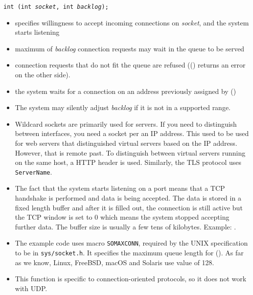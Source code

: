 

\begin{slide}
\texttt{int (int \emph{socket}, int \emph{backlog});}
\begin{itemize}
\item specifies willingness to accept incoming connections on \emph{socket}, and
the system starts listening
\item maximum of \emph{backlog} connection requests may wait in the queue to
be served
\item connection requests that do not fit the queue are refused
(() returns an error on the other side). 
\item the system waits for a connection on an address previously assigned by
()
\end{itemize}
\end{slide}

\begin{itemize}
\item The system may silently adjust \emph{backlog} if it is not in a supported
range.
\item Wildcard sockets are primarily used for servers.  If you need to
distinguish between interfaces, you need a socket per an IP address.  This used
to be used for web servers that distinguished virtual servers based on the IP
address.  However, that is remote past.  To distinguish between virtual servers
running on the same host, a HTTP header  is used.  Similarly,
the TLS protocol uses \texttt{ServerName}.
\item The fact that the system starts listening on a port means that a TCP
handshake is performed and data is being accepted.  The data is stored
in a fixed length buffer and after it is filled out, the connection is still
active but the TCP window is set to 0 which means the system stopped accepting
further data.  The buffer size is usually a few tens of kilobytes.
 Example: .
\item The example code uses macro \texttt{SOMAXCONN}, required by the UNIX
specification to be in \texttt{sys/socket.h}.  It specifies the maximum queue
length for ().  As far as we know, Linux, FreeBSD, macOS and
Solaris use value of 128.
\item This function is specific to connection-oriented protocols, so it does not
work with UDP.
\end{itemize}

